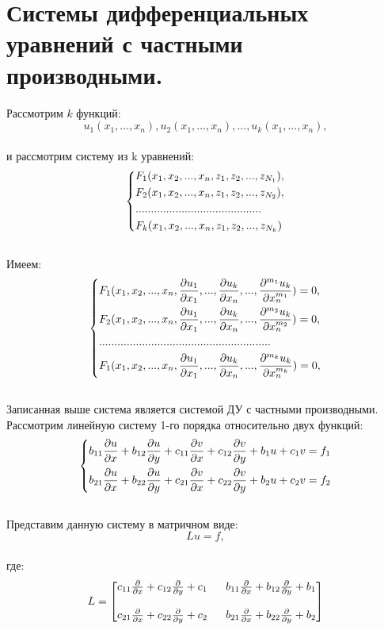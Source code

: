 \documentclass[../main.tex]{subfiles}
\begin{document}
\section{Системы дифференциальных уравнений с частными производными.}
Рассмотрим $k$ функций:
$$u_1(x_1,...,x_n),u_2(x_1,...,x_n),...,u_k(x_1,...,x_n),$$ \\
и рассмотрим систему из k уравнений:
$$\begin{dcases}
		F_1(x_1, x_2,..., x_n, z_1, z_2,..., z_{N_1}), \\
		F_2(x_1, x_2,..., x_n, z_1, z_2,..., z_{N_2}), \\
		.........................................      \\
		F_k(x_1, x_2,..., x_n, z_1, z_2,..., z_{N_k})
	\end{dcases} $$ \\
Имеем:
$$\begin{dcases}
		F_1(x_1, x_2,..., x_n, \frac{\partial u_1}{\partial x_1},...,\frac{\partial u_k}{\partial x_n},..., \frac{\partial ^{m_1} u_k}{\partial x^{m_1}_n}) = 0, \\
		F_2(x_1, x_2,..., x_n, \frac{\partial u_1}{\partial x_1},...,\frac{\partial u_k}{\partial x_n},..., \frac{\partial ^{m_2} u_k}{\partial x^{m_2}_n}) = 0, \\
		........................................................                                                                 \\
		F_1(x_1, x_2,..., x_n, \frac{\partial u_1}{\partial x_1},...,\frac{\partial u_k}{\partial x_n},..., \frac{\partial ^{m_k} u_k}{\partial x^{m_k}_n}) = 0, \\
	\end{dcases} $$ \\
Записанная выше система является системой ДУ с частными производными.\\
Рассмотрим линейную систему 1-го порядка относительно двух функций:\\
$$
	\begin{dcases}
		b_{11}\frac{\partial u}{\partial x} + b_{12}\frac{\partial u}{\partial y} + c_{11}\frac{\partial v}{\partial x} + c_{12}\frac{\partial v}{\partial y}+b_1u + c_1v = f_1 \\
		b_{21}\frac{\partial u}{\partial x} + b_{22}\frac{\partial u}{\partial y} + c_{21}\frac{\partial v}{\partial x} + c_{22}\frac{\partial v}{\partial y}+b_2u + c_2v = f_2
	\end{dcases}$$\\
Представим данную систему в матричном виде:\\
$$Lu = f,$$ \\
где:
$$
	L = \begin{bmatrix}
		c_{11}\pderiv{}{x} + c_{12}\pderiv{}{y} + c_1 \  & \ b_{11}\pderiv{}{x} + b_{12}\pderiv{}{y} + b_1 \\ \\
		c_{21}\pderiv{}{x} + c_{22}\pderiv{}{y} + c_2 \  & \ b_{21}\pderiv{}{x} + b_{22}\pderiv{}{y} + b_2
	\end{bmatrix}
$$ \\
\end{document}
